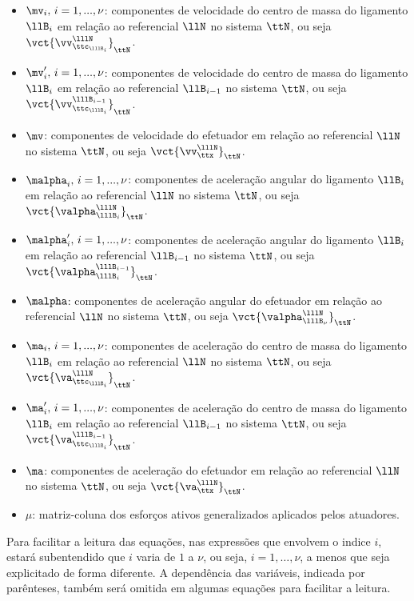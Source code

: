 \documentclass[]{politex}
\begin{document}
\begin{itemize}
\item $\mv_i, \,i=1, ..., \nu$: componentes de velocidade do centro de massa do ligamento $\llB_i$ em relação ao referencial $\llN$ no sistema $\ttN$, ou seja $\vct{\vv_{\ttc_{\lllB_i}}^{\lllN}}_\ttN$.
\item $\mv'_i, \,i=1, ..., \nu$: componentes de velocidade do centro de massa do ligamento $\llB_i$ em relação ao referencial $\llB_{i-1}$ no sistema $\ttN$, ou seja $\vct{\vv_{\ttc_{\lllB_i}}^{\lllB_{i-1}}}_\ttN$.
\item $\mv$: componentes de velocidade do efetuador em relação ao referencial $\llN$ no sistema $\ttN$, ou seja $\vct{\vv_{\ttx}^{\lllN}}_\ttN$.
\item $\malpha_i, \,i=1, ..., \nu$: componentes de aceleração angular do ligamento $\llB_i$ em relação ao referencial $\llN$ no sistema $\ttN$, ou seja $\vct{\valpha_{\lllB_i}^{\lllN}}_\ttN$.
\item $\malpha'_i, \,i=1, ..., \nu$: componentes de aceleração angular do ligamento $\llB_i$ em relação ao referencial $\llB_{i-1}$ no sistema $\ttN$, ou seja $\vct{\valpha_{\lllB_i}^{\lllB_{i-1}}}_\ttN$.
\item $\malpha$: componentes de aceleração angular do efetuador em relação ao referencial $\llN$ no sistema $\ttN$, ou seja $\vct{\valpha_{\lllB_\nu}^{\lllN}}_\ttN$.
\item $\ma_i, \,i=1, ..., \nu$: componentes de aceleração do centro de massa do ligamento $\llB_i$ em relação ao referencial $\llN$ no sistema $\ttN$, ou seja $\vct{\va_{\ttc_{\lllB_i}}^{\lllN}}_\ttN$.
\item $\ma'_i, \,i=1, ..., \nu$: componentes de aceleração do centro de massa do ligamento $\llB_i$ em relação ao referencial $\llB_{i-1}$ no sistema $\ttN$, ou seja $\vct{\va_{\ttc_{\lllB_i}}^{\lllB_{i-1}}}_\ttN$.
\item $\ma$: componentes de aceleração do efetuador em relação ao referencial $\llN$ no sistema $\ttN$, ou seja $\vct{\va_{\ttx}^{\lllN}}_\ttN$.
\item $\mu$: matriz-coluna dos esforços ativos generalizados aplicados pelos atuadores.
\end{itemize}

Para facilitar a leitura das equações, nas expressões que envolvem o indice $i$, estará subentendido que $i$ varia de $1$ a $\nu$, ou seja, $i=1,\hdots,\nu$, a menos que seja explicitado de forma diferente. A dependência das variáveis, indicada por parênteses, também será omitida em algumas equações para facilitar a leitura.
\end{document}

